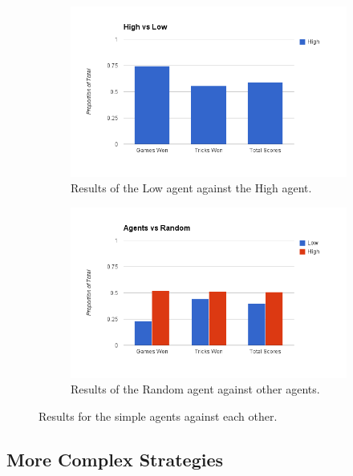\begin{figure}[ht]
    \begin{subfigure}[b]{0.5\textwidth}
        \centering
        \includegraphics[width=\textwidth]{data/low.png}
        \caption{Results of the Low agent against the High agent.}
        \label{fig:results_low}
    \end{subfigure}
    \begin{subfigure}[b]{0.5\textwidth}
        \centering
        \includegraphics[width=\textwidth]{data/random.png}
        \caption{Results of the Random agent against other agents.}
        \label{fig:results_random}
    \end{subfigure}
    \caption{Results for the simple agents against each other.}
\end{figure}

\subsection{More Complex Strategies}

